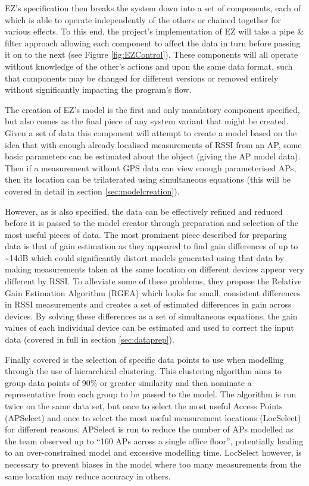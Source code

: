 \documentclass{UoYCSproject}
\begin{document}
            EZ's specification then breaks the system down into a set of components, each of which is able to operate independently of the others or chained together for various effects. To this end, the project's implementation of EZ will take a pipe \& filter approach allowing each component to affect the data in turn before passing it on to the next (see Figure \ref{fig:EZControl}). These components will all operate without knowledge of the other's actions and upon the same data format, such that components may be changed for different versions or removed entirely without significantly impacting the program's flow.
            
            The creation of EZ's model is the first and only mandatory component specified, but also comes as the final piece of any system variant that might be created. Given a set of data this component will attempt to create a model based on the idea that with enough already localised measurements of RSSI from an AP, some basic parameters can be estimated about the object (giving the AP model data). Then if a measurement without GPS data can view enough parameterised APs, then its location can be trilaterated using simultaneous equations (this will be covered in detail in section \ref{sec:modelcreation}).
            
            However, as is also specified, the data can be effectively refined and reduced before it is passed to the model creator through preparation and selection of the most useful pieces of data. The most prominent piece described for preparing data is that of gain estimation as they appeared to find gain differences of up to \textasciitilde14dB which could significantly distort models generated using that data by making measurements taken at the same location on different devices appear very different by RSSI. To alleviate some of these problems, they propose the Relative Gain Estimation Algorithm (RGEA) which looks for small, consistent differences in RSSI measurements and creates a set of estimated differences in gain across devices. By solving these differences as a set of simultaneous equations, the gain values of each individual device can be estimated and used to correct the input data (covered in full in section \ref{sec:dataprep}).
            
            Finally covered is the selection of specific data points to use when modelling through the use of hierarchical clustering. This clustering algorithm aims to group data points of 90\% or greater similarity and then nominate a representative from each group to be passed to the model. The algorithm is run twice on the same data set, but once to select the most useful Access Points (APSelect) and once to select the most useful measurement locations (LocSelect) for different reasons. APSelect is run to reduce the number of APs modelled as the team observed up to ``160 APs across a single office floor'', potentially leading to an over-constrained model and excessive modelling time. LocSelect however, is necessary to prevent biases in the model where too many measurements from the same location may reduce accuracy in others.
            
\end{document}
